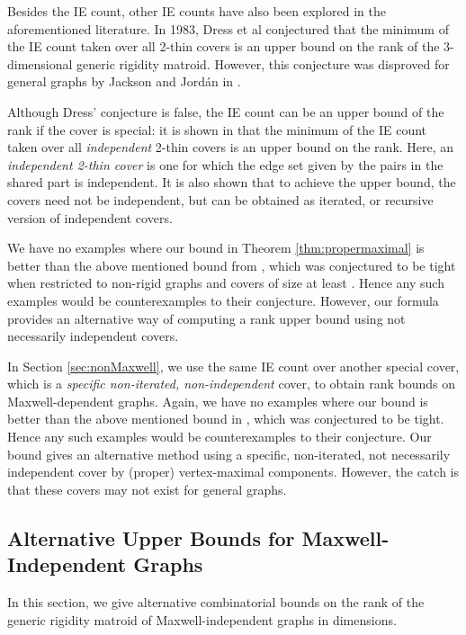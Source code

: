 \documentclass[10pt]{article}
\begin{document}
\medskip\noindent
Besides the IE count, other IE counts have also been explored in the aforementioned literature.
In 1983, Dress et al \cite{bib:Dress,bib:Tay84} conjectured that the minimum of the IE count taken over all 2-thin covers is an upper bound on the rank of the 3-dimensional generic rigidity matroid. However,
this conjecture was disproved for general graphs by Jackson and Jord\'an in
\cite{Jackson03thedress}. 

\medskip\noindent
Although Dress' conjecture is false, the IE count can be an upper bound of the rank if the cover is special: it is shown in \cite{JacksonJordanrank:2006} that the minimum of the IE count taken over all {\em independent} 2-thin covers is an upper bound on the rank. Here, an {\em independent 2-thin cover}  is one for which the edge set given by the pairs in the shared part  is independent. It is also shown that to achieve the upper bound, the covers need not be independent, but can be obtained as iterated, or recursive version of independent covers. 

\medskip\noindent
We have no examples where our bound in Theorem \ref{thm:propermaximal} is better than the above mentioned bound from \cite{JacksonJordanrank:2006}, which was conjectured to be tight when restricted to non-rigid graphs and covers of size at least . Hence any such examples would be counterexamples to their conjecture.
However, our formula provides an alternative way of computing a rank upper bound using not necessarily independent covers.

\medskip\noindent
In Section \ref{sec:nonMaxwell}, we use the same IE count
over another special cover, which is a {\em specific non-iterated, non-independent} cover, to obtain rank bounds on Maxwell-dependent graphs. 
Again, we have no examples where our
bound is better than the above mentioned bound in \cite{JacksonJordanrank:2006}, which was conjectured to be tight. Hence any such examples would be counterexamples to their
conjecture. Our bound gives an alternative method using a specific,
non-iterated, not necessarily independent cover by (proper) vertex-maximal components. However, the catch is that these covers may not exist for general graphs.




\subsection{Alternative Upper Bounds for Maxwell-Independent Graphs}\label{sec:proper}
In this section, we give alternative combinatorial bounds on the rank of the generic rigidity matroid of Maxwell-independent graphs in  dimensions.
\end{document}
